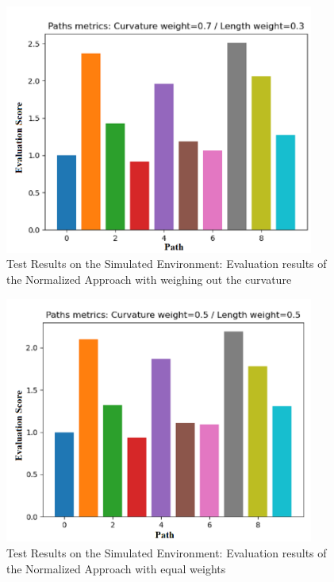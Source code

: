 \begin{figure}[H]
    \begin{center}
        \includegraphics[width=4in]{images/Chap2/w_0.7.png} %
        \caption{Test Results on the Simulated Environment: Evaluation results of the Normalized Approach
        with weighing out the curvature}
        \label{Test_Eval_Norm1}
        \end{center}    
\end{figure}
\begin{figure}[H]
    \begin{center}
        \includegraphics[width=4in]{images/Chap2/w_0.5.png} %
        \caption{Test Results on the Simulated Environment: Evaluation results of the Normalized Approach
        with equal weights}
        \label{Test_Eval_Norm2}
        \end{center}    
\end{figure}

